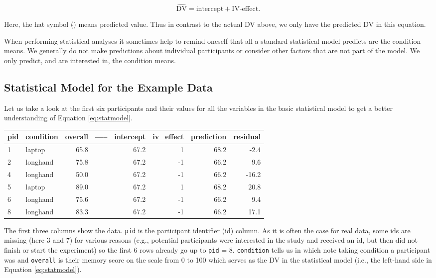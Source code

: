 \documentclass[
]{book}
\begin{document}
\begin{equation}
\hat{\text{DV}} = \text{intercept} + \text{IV-effect}.
\label{eq:predmodel}
\end{equation}

Here, the hat symbol (\(\hat{}\)) means predicted value. Thus in contrast to the actual DV above, we only have the predicted DV in this equation.

When performing statistical analyses it sometimes help to remind oneself that all a standard statistical model predicts are the condition means. We generally do not make predictions about individual participants or consider other factors that are not part of the model. We only predict, and are interested in, the condition means.

\hypertarget{statistical-model-for-the-example-data}{%
\subsection{Statistical Model for the Example Data}\label{statistical-model-for-the-example-data}}

Let us take a look at the first six participants and their values for all the variables in the basic statistical model to get a better understanding of Equation \eqref{eq:statmodel}.

\begin{tabular}{l|l|r|l|r|r|r|r}
\hline
pid & condition & overall & ----- & intercept & iv\_effect & prediction & residual\\
\hline
1 & laptop & 65.8 &  & 67.2 & 1 & 68.2 & -2.4\\
\hline
2 & longhand & 75.8 &  & 67.2 & -1 & 66.2 & 9.6\\
\hline
4 & longhand & 50.0 &  & 67.2 & -1 & 66.2 & -16.2\\
\hline
5 & laptop & 89.0 &  & 67.2 & 1 & 68.2 & 20.8\\
\hline
6 & longhand & 75.6 &  & 67.2 & -1 & 66.2 & 9.4\\
\hline
8 & longhand & 83.3 &  & 67.2 & -1 & 66.2 & 17.1\\
\hline
\end{tabular}

The first three columns show the data. \texttt{pid} is the participant identifier (id) column. As it is often the case for real data, some ids are missing (here 3 and 7) for various reasons (e.g., potential participants were interested in the study and received an id, but then did not finish or start the experiment) so the first 6 rows already go up to \texttt{pid} = 8. \texttt{condition} tells us in which note taking condition a participant was and \texttt{overall} is their memory score on the scale from 0 to 100 which serves as the DV in the statistical model (i.e., the left-hand side in Equation \eqref{eq:statmodel}).
\end{document}
